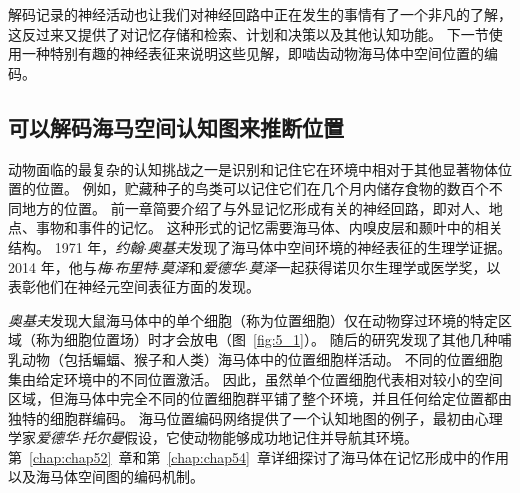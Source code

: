 解码记录的神经活动也让我们对神经回路中正在发生的事情有了一个非凡的了解，这反过来又提供了对记忆存储和检索、计划和决策以及其他认知功能。
下一节使用一种特别有趣的神经表征来说明这些见解，即啮齿动物海马体中空间位置的编码。


\subsection{可以解码海马空间认知图来推断位置}

动物面临的最复杂的认知挑战之一是识别和记住它在环境中相对于其他显著物体位置的位置。
例如，贮藏种子的鸟类可以记住它们在几个月内储存食物的数百个不同地方的位置。
前一章简要介绍了与外显记忆形成有关的神经回路，即对人、地点、事物和事件的记忆。
这种形式的记忆需要海马体、内嗅皮层和颞叶中的相关结构。
1971 年，\textit{约翰$\cdot$奥基夫}发现了海马体中空间环境的神经表征的生理学证据。
2014 年，他与\textit{梅$\cdot$布里特$\cdot$莫泽}和\textit{爱德华$\cdot$莫泽}一起获得诺贝尔生理学或医学奖，以表彰他们在神经元空间表征方面的发现。


\textit{奥基夫}发现大鼠海马体中的单个细胞（称为位置细胞）仅在动物穿过环境的特定区域（称为细胞位置场）时才会放电（图~\ref{fig:5_1}）。
随后的研究发现了其他几种哺乳动物（包括蝙蝠、猴子和人类）海马体中的位置细胞样活动。
不同的位置细胞集由给定环境中的不同位置激活。
因此，虽然单个位置细胞代表相对较小的空间区域，但海马体中完全不同的位置细胞群平铺了整个环境，并且任何给定位置都由独特的细胞群编码。
海马位置编码网络提供了一个认知地图的例子，最初由心理学家\textit{爱德华$\cdot$托尔曼}假设，它使动物能够成功地记住并导航其环境。
第~\ref{chap:chap52}~章和第~\ref{chap:chap54}~章详细探讨了海马体在记忆形成中的作用以及海马体空间图的编码机制。


